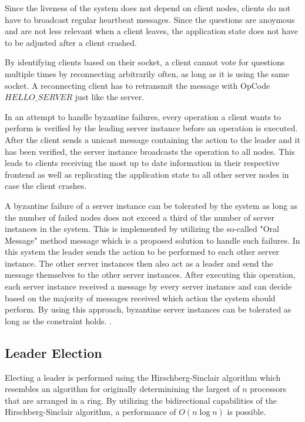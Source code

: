 \documentclass[runningheads]{llncs}
\begin{document}
Since the liveness of the system does not depend on client nodes, clients do not
have to broadcast regular heartbeat messages. Since the questions are anoymous
and are not less relevant when a client leaves, the application state does not
have to be adjusted after a client crashed.

By identifying clients based on their socket, a client cannot vote for questions
multiple times by reconnecting arbitrarily often, as long as it is using the same
socket. A reconnecting client has to retransmit the message with OpCode
$HELLO\_SERVER$ just like the server.

In an attempt to handle byzantine failures, every operation a client wants to
perform is verified by the leading server instance before an operation is
executed. After the client sends a unicast message containing the action to the
leader and it has been verified, the server instance broadcasts the operation
to all nodes. This leads to clients receiving the most up to date information
in their respective frontend as well as replicating the application state to
all other server nodes in case the client crashes.

A byzantine failure of a server instance can be tolerated by the system as
long as the number of failed nodes does not exceed a third of the number of
server instances in the system. This is implemented by utilizing the so-called
"Oral Message" method message which is a proposed solution to handle such
failures. In this system the leader sends the action to be performed to each
other server instance. The other server instances then also act as a leader and
send the message themselves to the other server instances. After executing this
operation, each server instance received a message by every server instance and
can decide based on the majority of messages received which action the system
should perform. By using this approach, byzantine server instances can be
tolerated as long as the constraint holds. \cite{lamport2019byzantine}.

\subsection{Leader Election}

Electing a leader is performed using the Hirschberg-Sinclair algorithm which
resembles an algorithm for originally determinining the largest of $n$
processors that are arranged in a ring.
By utilizing the bidirectional capabilities of the Hirschberg-Sinclair
algorithm, a performance of $O(n\log{}n)$ is possible.\cite{hirschberg1980decentralized}
\end{document}
